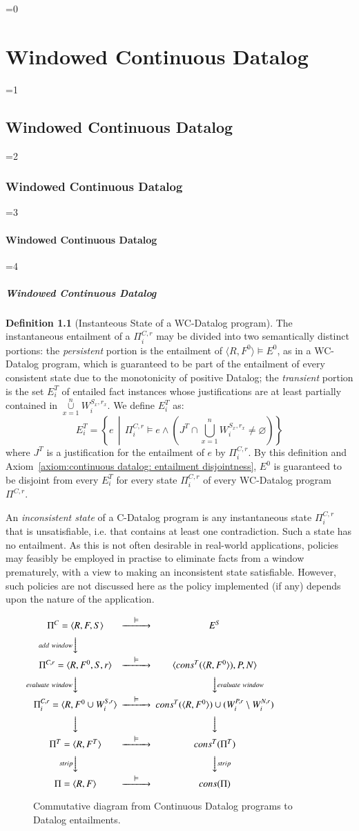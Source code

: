 \documentclass[twocolumn,preprint,3p,number]{elsarticle}
\theoremstyle{plain}
\theoremstyle{definition}
\newtheorem{definition}{Definition}
\newcounter{nestingdepth}
\newenvironment{nestedsection}[2]{
  \ifnum\value{nestingdepth}=0
    \chapter{#1}
  \else
    \ifnum\value{nestingdepth}=1
      \section{#1}
    \else
      \ifnum\value{nestingdepth}=2
        \subsection{#1}
      \else
        \ifnum\value{nestingdepth}=3
          \subsubsection{#1}
        \else
          \ifnum\value{nestingdepth}=4
            \paragraph{#1}
          \else
            \PackageError{nestedsections}{Maximum nesting level exceeded!}{uh oh!}
          \fi
        \fi
      \fi
    \fi
  \fi
  \addtocounter{nestingdepth}{1}
  \label{sec:#2}
}{\addtocounter{nestingdepth}{-1}}
\def\labelfig#1{\label{fig:#1}}
\begin{document}
\begin{nestedsection}{Windowed Continuous Datalog}{semantics}
\begin{definition}[Instanteous State of a WC-Datalog program]
The instantaneous entailment of a $\Pi^{C,r}_i$ may be divided into two
semantically distinct portions: the \emph{persistent} portion is the
entailment of ${\langle R, F^0 \rangle \models E^0}$, as in a WC-Datalog
program, which is guaranteed to be part of the entailment of every consistent
state due to the monotonicity of positive Datalog; the \emph{transient} portion
is the set $E^T_{i}$ of entailed fact instances whose justifications are at
least partially contained in $\mathop{\cup}\limits_{x=1}^n W^{S_x,r_x}_i$.
{\nobreak We define $E^T_i$ as:
\[
E^T_i = \left\{ e \,\middle\vert\, \Pi^{C,r}_i \models e \land \left( J^T \cap \bigcup_{x=1}^n W^{S_x,r_x}_i \neq \varnothing \right) \right\}
\]
where $J^T$ is a justification for the entailment of $e$ by
$\Pi^{C,r}_i$.} By this definition and Axiom~\ref{axiom:continuous
  datalog: entailment disjointness}, $E^0$ is guaranteed to be
disjoint from every $E^T_i$ for every state $\Pi^{C,r}_i$ of every
WC-Datalog program $\Pi^{C,r}$.

An \emph{inconsistent state} of a C-Datalog program is any instantaneous
state $\Pi^{C,r}_i$ that is unsatisfiable, i.e. that contains at least
one contradiction.  Such a state has no entailment.  As this is not often
desirable in real-world applications, policies may feasibly be employed in
practise to eliminate facts from a window prematurely, with a view to making
an inconsistent state satisfiable. However, such policies are not discussed
here as the policy implemented (if any) depends upon the nature of the
application.

\end{definition}

\begin{figure}
\centering
$
\begin{CD}
  {\Pi^C = \langle R, F, S \rangle} @>\models>> {E^S} \\
  @V{add\ window}VV \\
        {\Pi^{C,r} = \langle R, F^0, S, r \rangle} @>\models>> {\langle cons^T(\langle R, F^0\rangle), P, N \rangle} \\
        @V{evaluate\ window}VV @VV{evaluate\ window}V \\
        {\Pi^{C,r}_i = \langle R, F^0 \cup W^{S,r}_i \rangle} @>\models>> {cons^T(\langle R, F^0 \rangle) \cup (W^{P,r}_i \setminus W^{N,r}_i)} \\
  @VVV @VVV \\
        {\Pi^T = \langle R, F^T \rangle } @>\models>> {cons^T(\Pi^T)} \\
  @V{strip}VV @VV{strip}V \\
        {\Pi = \langle R, F \rangle } @>\models>> {cons(\Pi)}
\end{CD}
$
\caption{Commutative diagram from Continuous Datalog programs to Datalog entailments.}
\labelfig{CD-TD-D}
\end{figure}


\end{nestedsection}
\end{document}
